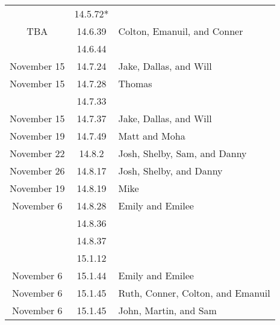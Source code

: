\documentclass[12pt]{amsart}
\begin{document}
\begin{longtable}{c|c|l}
                        & 14.5.72*                             &                                          \\
        TBA             & 14.6.39                              & Colton, Emanuil, and Conner              \\
                        & 14.6.44                              &                                          \\
        November 15     & 14.7.24                              & Jake, Dallas, and Will                   \\
        November 15     & 14.7.28                              & Thomas                                   \\
                        & 14.7.33                              &                                          \\
        November 15     & 14.7.37                              & Jake, Dallas, and Will                   \\
        November 19     & 14.7.49                              & Matt and Moha                            \\
        November 22     & 14.8.2                               & Josh, Shelby, Sam, and Danny             \\
        November 26     & 14.8.17                              & Josh, Shelby, and Danny                  \\
        November 19     & 14.8.19                              & Mike                                     \\
        November 6      & 14.8.28                              & Emily and Emilee                         \\
                        & 14.8.36                              &                                          \\
                        & 14.8.37                              &                                          \\
                        & 15.1.12                              &                                          \\
        November 6      & 15.1.44                              & Emily and Emilee                         \\
        November 6      & 15.1.45                              & Ruth, Conner, Colton, and Emanuil        \\
        November 6      & 15.1.45                              & John, Martin, and Sam                    \\

\end{longtable}
\end{document}
